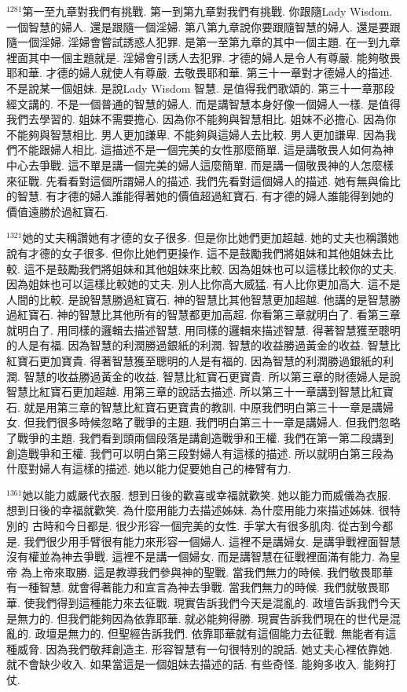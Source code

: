 \documentclass{book}
\begin{document}
$^{1281}$第一至九章對我們有挑戰.
第一到第九章對我們有挑戰.
你跟隨Lady Wisdom.
一個智慧的婦人.
還是跟隨一個淫婦.
第八第九章說你要跟隨智慧的婦人.
還是要跟隨一個淫婦.
淫婦會嘗試誘惑人犯罪.
是第一至第九章的其中一個主題.
在一到九章裡面其中一個主題就是.
淫婦會引誘人去犯罪.
才德的婦人是令人有尊嚴.
能夠敬畏耶和華.
才德的婦人就使人有尊嚴.
去敬畏耶和華.
第三十一章對才德婦人的描述.
不是說某一個姐妹.
是說Lady Wisdom 智慧.
是值得我們歌頌的.
第三十一章那段經文講的.
不是一個普通的智慧的婦人.
而是講智慧本身好像一個婦人一樣.
是值得我們去學習的.
姐妹不需要擔心.
因為你不能夠與智慧相比.
姐妹不必擔心.
因為你不能夠與智慧相比.
男人更加謙卑.
不能夠與這婦人去比較.
男人更加謙卑.
因為我們不能跟婦人相比.
這描述不是一個完美的女性那麼簡單.
這是講敬畏人如何為神中心去爭戰.
這不單是講一個完美的婦人這麼簡單.
而是講一個敬畏神的人怎麼樣來征戰.
先看看對這個所謂婦人的描述.
我們先看對這個婦人的描述.
她有無與倫比的智慧.
有才德的婦人誰能得著她的價值超過紅寶石.
有才德的婦人誰能得到她的價值遠勝於過紅寶石.

$^{1321}$她的丈夫稱讚她有才德的女子很多.
但是你比她們更加超越.
她的丈夫也稱讚她說有才德的女子很多.
但你比她們更操作.
這不是鼓勵我們將姐妹和其他姐妹去比較.
這不是鼓勵我們將姐妹和其他姐妹來比較.
因為姐妹也可以這樣比較你的丈夫.
因為姐妹也可以這樣比較她的丈夫.
別人比你高大威猛.
有人比你更加高大.
這不是人間的比較.
是說智慧勝過紅寶石.
神的智慧比其他智慧更加超越.
他講的是智慧勝過紅寶石.
神的智慧比其他所有的智慧都更加高超.
你看第三章就明白了.
看第三章就明白了.
用同樣的邏輯去描述智慧.
用同樣的邏輯來描述智慧.
得著智慧獲至聰明的人是有福.
因為智慧的利潤勝過銀紙的利潤.
智慧的收益勝過黃金的收益.
智慧比紅寶石更加寶貴.
得著智慧獲至聰明的人是有福的.
因為智慧的利潤勝過銀紙的利潤.
智慧的收益勝過黃金的收益.
智慧比紅寶石更寶貴.
所以第三章的財德婦人是說智慧比紅寶石更加超越.
用第三章的說話去描述.
所以第三十一章講到智慧比紅寶石.
就是用第三章的智慧比紅寶石更寶貴的教訓.
中原我們明白第三十一章是講婦女.
但我們很多時候忽略了戰爭的主題.
我們明白第三十一章是講婦人.
但我們忽略了戰爭的主題.
我們看到頭兩個段落是講創造戰爭和王權.
我們在第一第二段講到創造戰爭和王權.
我們可以明白第三段對婦人有這樣的描述.
所以就明白第三段為什麼對婦人有這樣的描述.
她以能力促要她自己的棒臂有力.

$^{1361}$她以能力威嚴代衣服.
想到日後的歡喜或幸福就歡笑.
她以能力而威儀為衣服.
想到日後的幸福就歡笑.
為什麼用能力去描述姊妹.
為什麼用能力來描述姊妹.
很特別的 古時和今日都是.
很少形容一個完美的女性.
手掌大有很多肌肉.
從古到今都是.
我們很少用手臂很有能力來形容一個婦人.
這裡不是講婦女.
是講爭戰裡面智慧沒有權並為神去爭戰.
這裡不是講一個婦女.
而是講智慧在征戰裡面滿有能力.
為皇帝 為上帝來取勝.
這是教導我們參與神的聖戰.
當我們無力的時候.
我們敬畏耶華有一種智慧.
就會得著能力和宣言為神去爭戰.
當我們無力的時候.
我們就敬畏耶華.
使我們得到這種能力來去征戰.
現實告訴我們今天是混亂的.
政壇告訴我們今天是無力的.
但我們能夠因為依靠耶華.
就必能夠得勝.
現實告訴我們現在的世代是混亂的.
政壇是無力的.
但聖經告訴我們.
依靠耶華就有這個能力去征戰.
無能者有這種威脅.
因為我們敬拜創造主.
形容智慧有一句很特別的說話.
她丈夫心裡依靠她.
就不會缺少收入.
如果當這是一個姐妹去描述的話.
有些奇怪.
能夠多收入.
能夠打仗.
\end{document}

